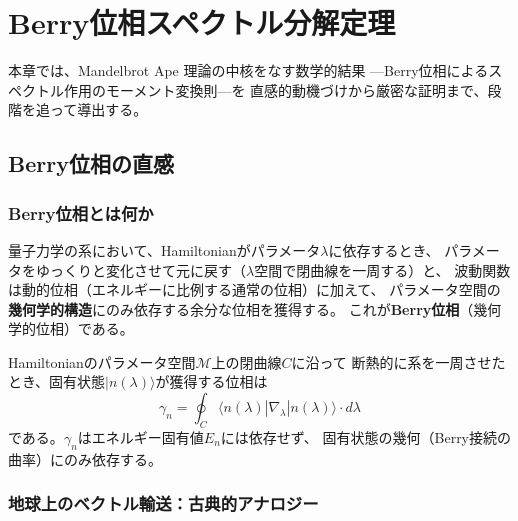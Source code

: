 

\chapter{Berry位相スペクトル分解定理}
\label{ch:berry-spectral-decomposition}

本章では、Mandelbrot Ape 理論の中核をなす数学的結果
---Berry位相によるスペクトル作用のモーメント変換則---を
直感的動機づけから厳密な証明まで、段階を追って導出する。

\section{Berry位相の直感}
\label{sec:7.1}

\subsection{Berry位相とは何か}

量子力学の系において、Hamiltonianがパラメータ$\lambda$に依存するとき、
パラメータをゆっくりと変化させて元に戻す（$\lambda$空間で閉曲線を一周する）と、
波動関数は動的位相（エネルギーに比例する通常の位相）に加えて、
パラメータ空間の\textbf{幾何学的構造}にのみ依存する余分な位相を獲得する。
これが\textbf{Berry位相}（幾何学的位相）である。

\begin{dfnbox}[Berry位相の定義]
Hamiltonianのパラメータ空間$\mathcal{M}$上の閉曲線$C$に沿って
断熱的に系を一周させたとき、固有状態$|n(\lambda)\rangle$が獲得する位相は
\[
\gamma_n = \oint_C \langle n(\lambda) | \nabla_\lambda | n(\lambda) \rangle \cdot d\lambda
\]
である。$\gamma_n$はエネルギー固有値$E_n$には依存せず、
固有状態の幾何（Berry接続の曲率）にのみ依存する。
\end{dfnbox}

\subsection{地球上のベクトル輸送：古典的アナロジー}

